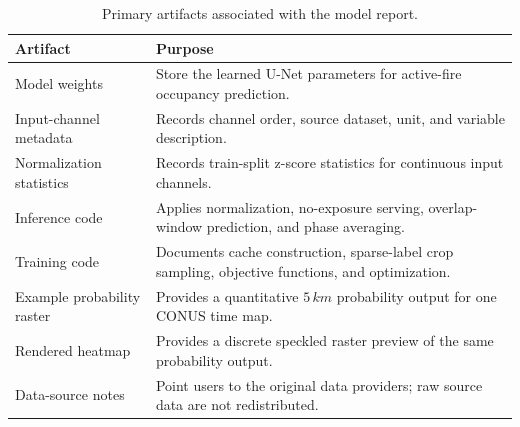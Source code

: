 \documentclass[11pt]{article}
\newcommand{\grid}{5\,km}
\begin{document}
\begin{table}[h]
\centering
\small
\caption{Primary artifacts associated with the model report.}
\label{tab:artifacts}
\begin{tabularx}{0.98\linewidth}{lY}
\toprule
Artifact & Purpose \\
\midrule
Model weights & Store the learned U-Net parameters for active-fire occupancy prediction. \\
Input-channel metadata & Records channel order, source dataset, unit, and variable description. \\
Normalization statistics & Records train-split z-score statistics for continuous input channels. \\
Inference code & Applies normalization, no-exposure serving, overlap-window prediction, and phase averaging. \\
Training code & Documents cache construction, sparse-label crop sampling, objective functions, and optimization. \\
Example probability raster & Provides a quantitative \(\grid\) probability output for one CONUS time map. \\
Rendered heatmap & Provides a discrete speckled raster preview of the same probability output. \\
Data-source notes & Point users to the original data providers; raw source data are not redistributed. \\
\bottomrule
\end{tabularx}
\end{table}
\end{document}

